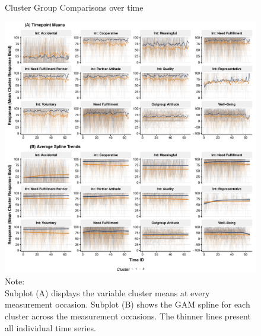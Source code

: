 \begin{figure}[!ht] %
  \caption{Cluster Group Comparisons over time}
  \label{fig:clusterTs}
  \centering\includegraphics[width=\textwidth]{figures/clusterTsComb.pdf}
  \caption*{Note: \\
  Subplot (A) displays the variable cluster means at every measurement occasion. Subplot (B) shows the GAM spline for each cluster across the measurement occasions. The thinner lines present all individual time series.}
\end{figure}
